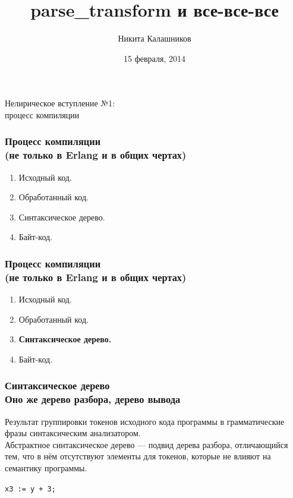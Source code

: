 \documentclass[10pt]{beamer}
\title[Erlang Dnipro 2014]{parse\_transform и все-все-все}
\date{15 февраля, 2014}
\author{Никита Калашников}
\begin{document}
    \frame{\titlepage}

    \begin{frame}[c]
        \frametitle{}
        \LARGE\begin{center}
            {\color{darkred} Нелирическое вступление №1:\\процесс компиляции}
        \end{center}
    \end{frame}

    \begin{frame}
        \frametitle{Процесс компиляции\\{\normalsize (не только в Erlang и в общих чертах)}}
        \begin{enumerate}
            \item Исходный код.
            \item Обработанный код.
            \item Синтаксическое дерево.
            \item Байт-код.
        \end{enumerate}
    \end{frame}

    \begin{frame}
        \frametitle{Процесс компиляции\\{\normalsize (не только в Erlang и в общих чертах)}}
        \begin{enumerate}
            \item Исходный код.
            \item Обработанный код.
            \item \textbf{Синтаксическое дерево.}
            \item Байт-код.
        \end{enumerate}
    \end{frame}

    \begin{frame}
        \frametitle{Синтаксическое дерево\\{\normalsize Оно же дерево разбора, дерево вывода}}
        Результат группировки токенов исходного кода программы в грамматические фразы синтаксическим
        анализатором. \vspace{0.5cm} \\

        Абстрактное синтаксическое дерево — подвид дерева разбора, отличающийся тем, что в нём отсутствуют
        элементы для токенов, которые не влияют на семантику программы.
        \begin{center}
            \texttt{x3 := y + 3; } \hspace{1cm}
        \end{center}
    \end{frame}
\end{document}

